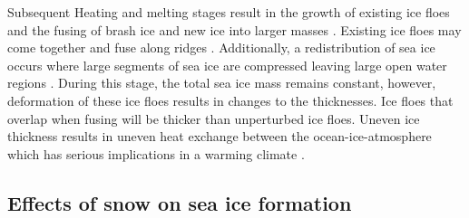 Subsequent Heating and melting stages result in the growth of existing ice floes and the fusing of brash ice and new ice into larger masses \cite{arrigo2004large}. Existing ice floes may come together and fuse along ridges \cite{womack_2020}. Additionally, a redistribution of sea ice occurs where large segments of sea ice are compressed leaving large open water regions \cite{womack_2020}. During this stage, the total sea ice mass remains constant, however, deformation of these ice floes results in changes to the thicknesses. Ice floes that overlap when fusing will be thicker than unperturbed ice floes. Uneven ice thickness results in uneven heat exchange between the ocean-ice-atmosphere which has serious implications in a warming climate \cite{womack_2020}.

\subsection{Effects of snow on sea ice formation}

